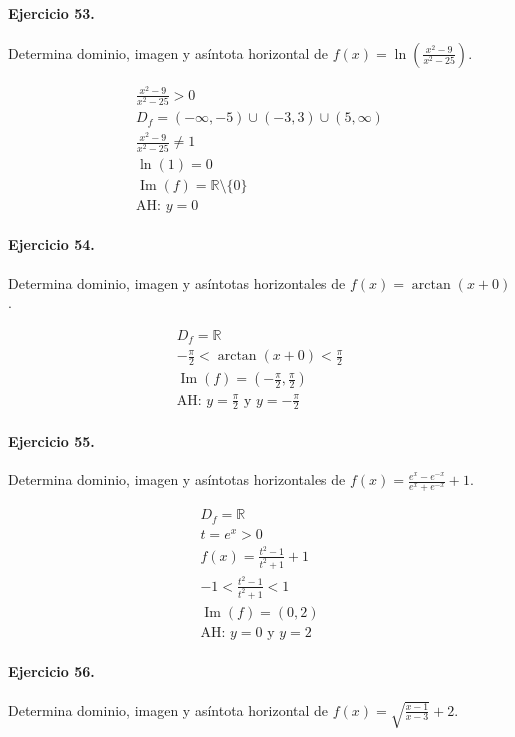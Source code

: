 \documentclass[11pt,a4paper]{article}
\begin{document}
\paragraph{Ejercicio 53.} Determina dominio, imagen y asíntota horizontal de $f(x)=\ln\left(\frac{x^2-9}{x^2-25}\right)$.

\[
\begin{aligned}
\frac{x^2-9}{x^2-25} >0\\
D_f=(-\infty,-5)\cup(-3,3)\cup(5,\infty)\\
\frac{x^2-9}{x^2-25}\ne1\\
\ln(1)=0\\
\operatorname{Im}(f)=\mathbb{R}\setminus\{0\}\\
\text{{AH: }}y=0
\end{aligned}
\]


\paragraph{Ejercicio 54.} Determina dominio, imagen y asíntotas horizontales de $f(x)=\arctan(x+0)$.

\[
\begin{aligned}
D_f=\mathbb{R}\\
-\frac{\pi}{2}<\arctan(x+0)<\frac{\pi}{2}\\
\operatorname{Im}(f)=\left(-\frac{\pi}{2},\frac{\pi}{2}\right)\\
\text{AH: }y=\frac{\pi}{2}\text{ y }y=-\frac{\pi}{2}
\end{aligned}
\]


\paragraph{Ejercicio 55.} Determina dominio, imagen y asíntotas horizontales de $f(x)=\frac{e^x-e^{-x}}{e^x+e^{-x}}+1$.

\[
\begin{aligned}
D_f=\mathbb{R}\\
t=e^x>0\\
f(x)=\frac{t^2-1}{t^2+1}+1\\
-1<\frac{t^2-1}{t^2+1}<1\\
\operatorname{Im}(f)=(0,2)\\
\text{AH: }y=0\text{ y }y=2
\end{aligned}
\]


\paragraph{Ejercicio 56.} Determina dominio, imagen y asíntota horizontal de $f(x)=\sqrt{\frac{x-1}{x-3}}+2$.
\end{document}
